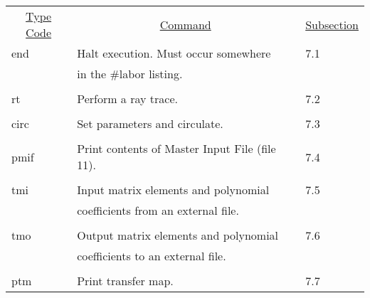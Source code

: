 \begin{center}
\begin{tabular}{lll}
\multicolumn{1}{c}{\underline {Type Code}} &
\multicolumn{1}{c}{\underline{Command}}   &
\multicolumn{1}{c}{\underline{Subsection}} \\
\hspace{1.5em}end   &        Halt execution.  Must occur somewhere         & \hspace{2em}7.1\\
                    & in the \#labor listing.                  &\\
\vspace{-3mm}& &\\
\hspace{1.5em}rt    &        Perform a ray trace.                  & \hspace{2em}7.2\\
\vspace{-3mm}& &\\
\hspace{1.5em}circ  &         Set parameters and circulate.        & \hspace{2em}7.3\\
\vspace{-3mm}& &\\
\hspace{1.5em}pmif  & Print contents of Master Input File (file 11). & \hspace{2em}7.4\\
\vspace{-3mm}& &\\
\hspace{1.5em}tmi   &        Input matrix elements and polynomial  & \hspace{2em}7.5\\
                    & coefficients from an external file.          &\\
\vspace{-3mm}& &\\
\hspace{1.5em}tmo   &        Output matrix elements and polynomial & \hspace{2em}7.6\\
                    & coefficients to an external file.            &\\
\vspace{-3mm}& &\\
\hspace{1.5em}ptm   &        Print transfer map.                   & \hspace{2em}7.7\\

\end{tabular}
\end{center}
